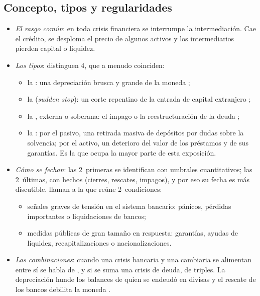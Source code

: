 \documentclass[11pt]{article}
\begin{document}
\subsection{Concepto, tipos y regularidades}\label{sec:crisis-concepto}

\begin{itemize}
\item \emph{El rasgo común}: en toda crisis financiera se interrumpe la intermediación. Cae el crédito, se desploma el precio de algunos activos y los intermediarios pierden capital o liquidez\nocite{ClaessensKose2013Financial}.
\item \emph{Los tipos}: \textcite{ClaessensKose2013Financial} distinguen 4, que a menudo coinciden:
  \begin{itemize}
  \item la : una depreciación brusca y grande de la moneda ;
  \item la  (\emph{sudden stop}): un corte repentino de la entrada de capital extranjero ;
  \item la , externa o soberana: el impago o la reestructuración de la deuda  ;
  \item la : por el pasivo, una retirada masiva de depósitos por dudas sobre la solvencia; por el activo, un deterioro del valor de los préstamos y de sus garantías. Es la que ocupa la mayor parte de esta exposición.
  \end{itemize}
\item \emph{Cómo se fechan}: las 2~primeras se identifican con umbrales cuantitativos; las 2~últimas, con hechos (cierres, rescates, impagos), y por eso su fecha es más discutible\nocite{ClaessensKose2013Financial}. \textcite{LaevenValencia2020} llaman  a la que reúne 2~condiciones:
  \begin{itemize}
  \item señales graves de tensión en el sistema bancario: pánicos, pérdidas importantes o liquidaciones de bancos;
  \item medidas públicas de gran tamaño en respuesta: garantías, ayudas de liquidez, recapitalizaciones o nacionalizaciones.
  \end{itemize}
\item \emph{Las combinaciones}: cuando una crisis bancaria y una cambiaria se alimentan entre sí se habla de \nocite{KaminskyReinhart1999}, y si se suma una crisis de deuda, de triples. La depreciación hunde los balances de quien se endeudó en divisas y el rescate de los bancos debilita la moneda .
\end{itemize}
\end{document}
